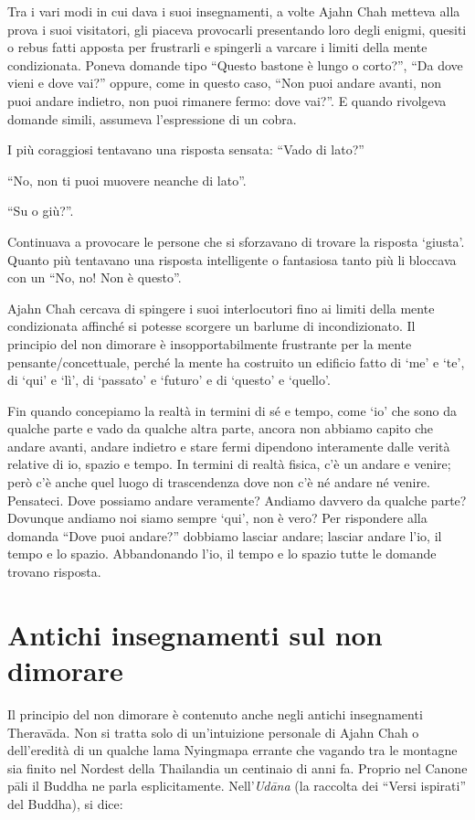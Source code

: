 Tra i vari modi in cui dava i suoi insegnamenti, a volte Ajahn Chah metteva alla prova i suoi visitatori, gli piaceva provocarli presentando loro degli enigmi, quesiti o rebus fatti apposta per frustrarli e spingerli a varcare i limiti della mente condizionata. Poneva domande tipo ``Questo bastone è lungo o corto?'', ``Da dove vieni e dove vai?'' oppure, come in questo caso, ``Non puoi andare avanti, non puoi andare indietro, non puoi rimanere fermo: dove vai?''. E quando rivolgeva domande simili, assumeva l'espressione di un cobra.

I più coraggiosi tentavano una risposta sensata: ``Vado di lato?''

``No, non ti puoi muovere neanche di lato''.

``Su o giù?''.

Continuava a provocare le persone che si sforzavano di trovare la risposta `giusta'. Quanto più tentavano una risposta intelligente o fantasiosa tanto più li bloccava con un ``No, no! Non è questo''.

Ajahn Chah cercava di spingere i suoi interlocutori fino ai limiti della mente condizionata affinché si potesse scorgere un barlume di incondizionato. Il principio del non dimorare è insopportabilmente frustrante per la mente pensante/concettuale, perché la mente ha costruito un edificio fatto di `me' e `te', di `qui' e `lì', di `passato' e `futuro' e di `questo' e `quello'.

Fin quando concepiamo la realtà in termini di sé e tempo, come `io' che sono da qualche parte e vado da qualche altra parte, ancora non abbiamo capito che andare avanti, andare indietro e stare fermi dipendono interamente dalle verità relative di io, spazio e tempo. In termini di realtà fisica, c'è un andare e venire; però c'è anche quel luogo di trascendenza dove non c'è né andare né venire. Pensateci. Dove possiamo andare veramente? Andiamo davvero da qualche parte? Dovunque andiamo noi siamo sempre `qui', non è vero? Per rispondere alla domanda ``Dove puoi andare?'' dobbiamo lasciar andare; lasciar andare l'io, il tempo e lo spazio. Abbandonando l'io, il tempo e lo spazio tutte le domande trovano risposta.

\section*{Antichi insegnamenti sul non dimorare}

Il principio del non dimorare è contenuto anche negli antichi insegnamenti Theravāda. Non si tratta solo di un'intuizione personale di Ajahn Chah o dell'eredità di un qualche lama Nyingmapa errante che vagando tra le montagne sia finito nel Nordest della Thailandia un centinaio di anni fa. Proprio nel Canone pāli il Buddha ne parla esplicitamente. Nell'\textit{Udāna} (la raccolta dei ``Versi ispirati'' del Buddha), si dice:

